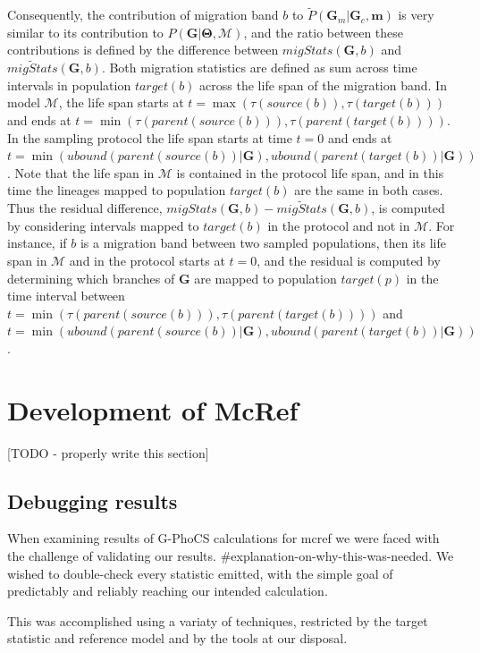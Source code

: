 \documentclass[11pt]{article}
\newcommand{\vect}[1]{\boldsymbol{\mathbf{#1}}}
\newcommand{\M}{\mathcal{M}}
\newcommand{\G}{\vect{G}}
\newcommand{\T}{\vect{\Theta}}
\newcommand{\Pref}{\widetilde{P}}
\newcommand{\1}{\mathbbm{1}}
\newcommand{\Gc}{\G_c}
\newcommand{\Gm}{\G_m}
\newcommand{\gp}{G-PhoCS }
\newcommand{\migs}{\vect{m}}
\begin{document}
Consequently, the contribution of migration band $b$ to $\Pref(\Gm|\Gc,\migs)$ is very similar to its contribution to $P(\G|\T,\M)$, and the ratio
between these contributions is defined by the difference between $migStats(\G,b)$ and $\widetilde{migStats}(\G,b)$.
Both migration statistics are defined as sum across time intervals in population $target(b)$ across the life span of the migration band.
In model $\M$, the life span starts at $t=\max(\tau(source(b)),\tau(target(b)))$ and ends at $t=\min(\tau(parent(source(b))),\tau(parent(target(b))))$.
In the sampling protocol the life span starts at time $t=0$ and ends at $t=\min(ubound(parent(source(b))|\G),ubound(parent(target(b))|\G))$.
Note that the life span in $\M$ is contained in the protocol life span, and in this time the lineages mapped to population $target(b)$ are the same in both cases.
Thus the residual difference, $migStats(\G,b)-\widetilde{migStats}(\G,b)$, is computed by considering intervals mapped to $target(b)$ in the protocol and not in $\M$.
For instance, if $b$ is a migration band between two sampled populations, then its life span in $\M$ and in the protocol starts at $t=0$, and the residual is computed by 
determining which branches of $\G$ are mapped to population $target(p)$ in the time interval between $t=\min(\tau(parent(source(b))),\tau(parent(target(b))))$ and
$t=\min(ubound(parent(source(b))|\G),ubound(parent(target(b))|\G))$.





\section{Development of McRef}
[TODO - properly write this section]

\subsection{Debugging results}

When examining results of \gp calculations for mcref we were faced with the challenge of validating our results. \#explanation-on-why-this-was-needed. We wished to double-check every statistic emitted, with the simple goal of predictably and reliably reaching our intended calculation.

This was accomplished using a variaty of techniques, restricted by the target statistic and reference model and by the tools at our disposal. 
\end{document}
